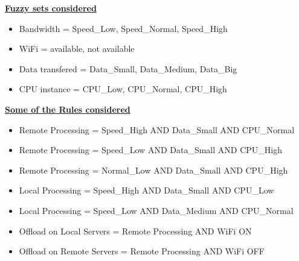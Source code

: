 \documentclass{article}
\begin{document}
\begin{center}
\textbf{\underline{Fuzzy sets considered}}

\begin{itemize}

\item Bandwidth = Speed\_Low, Speed\_Normal, Speed\_High
\item WiFi = available, not available 
\item Data transfered = Data\_Small, Data\_Medium, Data\_Big 
\item CPU instance = CPU\_Low, CPU\_Normal, CPU\_High 


\end{itemize}

\textbf{\underline{Some of the Rules considered}}
\begin{itemize}
\item Remote Processing = Speed\_High AND Data\_Small AND CPU\_Normal
\item Remote Processing = Speed\_Low AND Data\_Small AND CPU\_High
\item Remote Processing = Normal\_Low AND Data\_Small AND CPU\_High
\item Local Processing = Speed\_High AND Data\_Small AND CPU\_Low
\item Local Processing = Speed\_Low AND Data\_Medium AND CPU\_Normal
\item Offload on Local Servers = Remote Processing AND WiFi ON
\item Offload on Remote Servers = Remote Processing AND WiFi OFF
\end{itemize}
\end{center}
\end{document}
